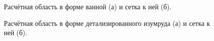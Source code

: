 \begin{figure}
	\begin{minipage}[h]{0.49\linewidth}
	\end{minipage}
	\hfill
	\begin{minipage}[h]{0.49\linewidth}
	\end{minipage}
	\caption{Расчётная область в форме ванной (а) и сетка к ней (б).}
	\label{fig:Bath}
\end{figure}

\begin{figure}
	\begin{minipage}[h]{0.49\linewidth}
	\end{minipage}
	\hfill
	\begin{minipage}[h]{0.49\linewidth}
	\end{minipage}
	\caption{Расчётная область в форме детализированного изумруда (а) и сетка к ней (б).}
	\label{fig:DEmerald}
\end{figure}

